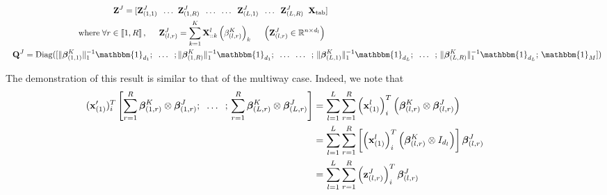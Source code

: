 \documentclass[10pt]{article}
\begin{document}
\begin{align}
    \mathbf{Z}^J = [ \mathbf{Z}_{(1,1)}^J \; \; \hdots \; \;                                                        & \mathbf{Z}_{(1,R)}^J  \; \; \hdots  \; \; \hdots \; \; \mathbf{Z}_{(L,1)}^J \; \; \hdots \; \; \mathbf{Z}_{(L,R)}^J \; \; \mathbf{X}_{\text{tab}}] \label{eqref: Z_j}                                                                                                                      \\
    \text{where} \; \forall r \in \llbracket 1, R\rrbracket\, , \hspace{0.5 cm} \mathbf{Z}_{(l,r)}^J                & = \sum\limits_{k = 1}^K \mathbf{X}^l_{::k} \left(\beta_{(l,r)}^K\right)_k \hspace{0.5 cm} \left(\mathbf{Z}_{(l,r)}^J \in \mathbb{R}^{n \times d_l}\right) \label{eqref: Z_r}                                                                                                               \\
    \hspace{7 pt}
    \mathbf{Q}^J = \text{Diag}([\lVert \bm{\beta}_{(1,1)}^K \rVert_1^{-1} \mathbbm{1}_{d_1}; \; \; \hdots \; \;; \, & \lVert \bm{\beta}_{(1,R)}^K \rVert_1^{-1} \mathbbm{1}_{d_1};  \; \; \hdots \; \;  \hdots \; \; ;\, \lVert \bm{\beta}_{(L,1)}^K \rVert_1^{-1} \mathbbm{1}_{d_L};  \; \;  \hdots \; \; ;\, \lVert \bm{\beta}_{(L,R)}^K \rVert_1^{-1} \mathbbm{1}_{d_L}; \, \mathbbm{1}_M]) \label{eqref:Q^J}
\end{align}

The demonstration of this result is similar to that of the multiway case. Indeed, we note that
\begin{align}
    \hspace{-40 pt}(\mathbf{x}_{(1)}')_i^T \left[ \sum\limits_{r = 1}^R \bm{\beta}_{(1,r)}^K \otimes \bm{\beta}_{(1,r)}^J;   \; \; \hdots  \; \; ;\, \sum\limits_{r = 1}^R \bm{\beta}_{(L,r)}^K \otimes \bm{\beta}_{(L,r)}^J \right] & = \sum\limits_{l = 1}^L \sum\limits_{r = 1}^R \left(\mathbf{x}_{(1)}^l\right)_i^T \left(\bm{\beta}_{(l,r)}^K \otimes \bm{\beta}_{(l,r)}^J \right)                        \\
                                                                                                                                                                                                                                     & = \sum\limits_{l = 1}^L \sum\limits_{r = 1}^R \left[ \left(\mathbf{x}_{(1)}^l\right)_i^T \left( \bm{\beta}_{(l,r)}^K \otimes I_{d_l} \right) \right]\bm{\beta}_{(l,r)}^J \\
                                                                                                                                                                                                                                     & = \sum\limits_{l = 1}^L \sum\limits_{r = 1}^R \left(\mathbf{z}_{(l,r)}^J\right)_i^T \bm{\beta}_{(l,r)}^J
\end{align}
\end{document}

